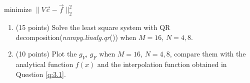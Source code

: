 \documentclass[10pt]{article}
\begin{document}
\begin{center}
minimize $\|V \vec{c}-\vec{f}\|_{2}^{2}$
\end{center}

\begin{enumerate}[label=4.\arabic*]
    \item (15 points)
    Solve the least square system with QR decomposition(\textit{numpy.linalg.qr}()) when $M=16$, $N=4,8$.
    \item (10 points)
    Plot the $g_V$, $g_F$ when $M=16$, $N=4,8$, compare them with the analytical function $f(x)$ and the interpolation function obtained in Question \ref{q:3.1}.
\end{enumerate}
\end{document}
